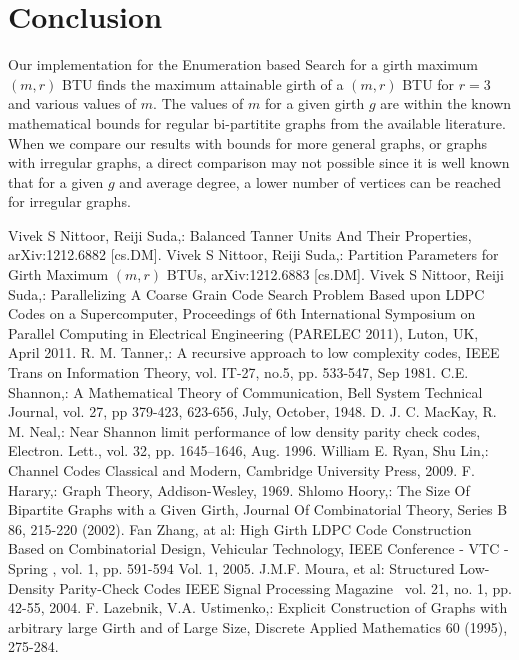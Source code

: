 \documentclass{llncs}
\begin{document}
\section{Conclusion}
Our implementation for the Enumeration based Search for a girth maximum $(m, r)$ BTU finds the maximum attainable girth of a  $(m,r)$ BTU for  $r = 3$ and various values of $m$.  The values of $m$ for a given girth $g$ are within the known mathematical bounds for regular bi-partitite graphs from the available literature. When we compare our results with bounds for more general graphs, or graphs with irregular graphs, a direct comparison may not possible since it is well known that for a given $g$ and average degree, a lower number of vertices can be reached for irregular graphs.  
\begin{thebibliography}{[MT1]}
\bibitem[1]{}
Vivek S Nittoor, Reiji Suda,:
Balanced Tanner Units And Their Properties,
arXiv:1212.6882 [cs.DM].
\bibitem[2]{}
Vivek S Nittoor, Reiji Suda,:
Partition Parameters for Girth Maximum $(m ,r)$ BTUs,
arXiv:1212.6883 [cs.DM].
\bibitem[3]{}
Vivek S Nittoor, Reiji Suda,:
Parallelizing A Coarse Grain Code Search Problem Based upon LDPC Codes on a Supercomputer,
Proceedings of 6th International Symposium on Parallel Computing in Electrical Engineering (PARELEC 2011), Luton, UK, April 2011.
\bibitem[4]{}
R. M. Tanner,:
A recursive approach to low complexity codes,
IEEE Trans on Information Theory, vol. IT-27, no.5, pp. 533-547, Sep 1981. 
\bibitem[5]{}
C.E. Shannon,:
A Mathematical Theory of Communication,
Bell System Technical Journal, vol. 27, pp 379-423, 623-656, July, October, 1948.
\bibitem[6]{}
D. J. C. MacKay, R. M. Neal,:
Near Shannon limit performance of low density parity check codes,
 Electron. Lett., vol. 32, pp. 1645--1646, Aug. 1996.
\bibitem[7]{}
William E. Ryan, Shu Lin,:
Channel Codes Classical and Modern,
Cambridge University Press, 2009.
\bibitem[8]{}
F. Harary,:
Graph Theory,
Addison-Wesley, 1969.
\bibitem[9]{}
Shlomo Hoory,:
The Size Of Bipartite Graphs with a Given Girth,
Journal Of Combinatorial Theory, Series B 86, 215-220 (2002).
\bibitem[10]{}
Fan Zhang, at al:
High Girth LDPC Code Construction Based on Combinatorial Design,
Vehicular Technology, IEEE Conference - VTC -Spring , vol. 1, pp. 591-594 Vol. 1, 2005.
\bibitem[11]{}
J.M.F. Moura, et al:
Structured Low-Density Parity-Check Codes
IEEE Signal Processing Magazine \ vol. 21, no. 1, pp. 42-55, 2004.
\bibitem[12]{}
F. Lazebnik, V.A. Ustimenko,:
Explicit Construction of Graphs with arbitrary large Girth and of Large Size,
Discrete Applied Mathematics 60 (1995), 275-284.

\end{thebibliography}
\end{document}
